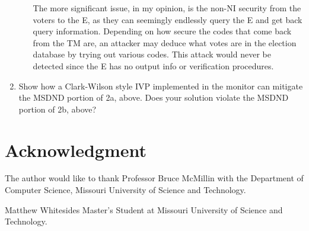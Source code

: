 \documentclass[journal,onecolumn]{IEEEtran}
\begin{document}
\begin{enumerate}
\begin{enumerate}
      The more significant issue, in my opinion, is the non-NI security from the voters to the E, as they can seemingly endlessly query the E and get back query information. Depending on how secure the codes that come back from the TM are, an attacker may deduce what votes are in the election database by trying out various codes. This attack would never be detected since the E has no output info or verification procedures. 

    \end{enumerate}
    \item Show how a Clark-Wilson style IVP implemented in the monitor can mitigate the MSDND portion of 2a, above.  Does your solution violate the MSDND portion of 2b, above?
\end{enumerate}




\section*{Acknowledgment}
The author would like to thank Professor Bruce McMillin with the Department of Computer Science, Missouri University of Science and Technology.

\ifCLASSOPTIONcaptionsoff
  \newpage
\fi

\begin{IEEEbiographynophoto}{Matthew Whitesides}
  Master's Student at Missouri University of Science and Technology.
\end{IEEEbiographynophoto}

\end{document}
